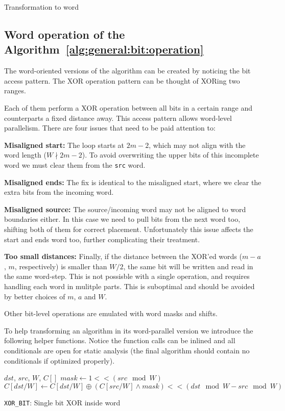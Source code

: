 Transformation to word

\subsection{Word operation of the  Algorithm~\ref{alg:general:bit:operation}}\label{sec:word:operation}

The word-oriented versions of the algorithm can be created by noticing the bit access pattern. The XOR operation pattern can be thought of XORing two ranges.

Each of them perform a XOR operation between all bits in a certain range and counterparts a fixed distance away. This access pattern allows word-level parallelism. There are four issues that need to be paid attention to:

\textbf{Misaligned start:}
The loop starts at $2m -2$, which may not align with the word length ($W \nmid 2m-2$). To avoid overwriting the upper bits of this incomplete word we must clear them from the \texttt{src} word.

\textbf{Misaligned ends:}
The fix is identical to the misaligned start, where we clear the extra bits from the incoming word.

\textbf{Misaligned source:}
The source/incoming word may not be aligned to word boundaries either. In this case we need to pull bits from the next word too, shifting both of them for correct placement. Unfortunately this issue affects the start and ends word too, further complicating their treatment.

\textbf{Too small distances:}
Finally, if the distance between the XOR'ed words ($m-a$, $m$, respectively) is smaller than $W/2$, the same bit will be written and read in the same word-step. This is not possisble with a single operation, and requires handling each word in mulitple parts. This is suboptimal and should be avoided by better choices of $m$, $a$ and $W$.

Other bit-level operations are emulated with word masks and shifts.

To help transforming an algorithm in its word-parallel version we introduce the following helper functions. Notice the function calls can be inlined and all conditionals are open for static analysis (the final algorithm should contain no conditionals if optimized properly).

\begin{algorithm}
\begin{algorithmic}[1]
  \REQUIRE $dst$, $src$, $W$, $C[]$
  \STATE $mask \gets 1 << (src \mod W)$
  \STATE $C[dst / W] \gets C[dst / W] \oplus (C[src / W] \land mask) << (dst \mod W - src \mod W)$
  \caption{\texttt{XOR\_BIT}: Single bit XOR inside word}
\end{algorithmic}
\end{algorithm}

